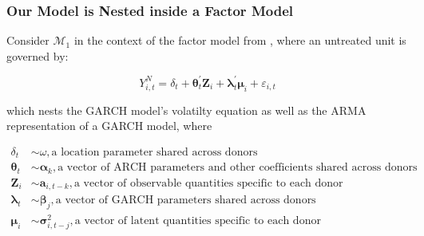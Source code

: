 \documentclass[9pt]{beamer}
\def\mc#1{\mathcal{#1}} %
\def\E{\mathbb{E}} %
\def\mc#1{\mathcal{#1}}
\theoremstyle{definition}
\begin{document}

\begin{frame}
\frametitle{Our Model is Nested inside a Factor Model}

\fontsize{6}{7.2}

Consider $\mc{M}_{1}$ in the context of the factor model from \cite[][]{abadie2010synthetic}, where an untreated unit is governed by:

$$Y^{N}_{i,t} = \delta_{t} + \boldsymbol\theta_{t}^{'}\textbf{Z}_{i}+\boldsymbol\lambda_{t}^{'}\boldsymbol\mu_{i}+\varepsilon_{i,t}$$

which nests the GARCH model's volatilty equation as well as the ARMA representation of a GARCH model, where

\begin{align*}
\delta_{t} & \sim \omega, \text{a location parameter shared across donors}\\
\boldsymbol\theta_{t} & \sim \boldsymbol\alpha_{k}, \text{a vector of ARCH parameters and other coefficients shared across donors} \\
\textbf{Z}_{i} & \sim \boldsymbol a_{i,t-k}, \text{a vector of observable quantities specific to each donor} \\
\boldsymbol \lambda_{t} & \sim \boldsymbol\beta_{j}, \text{a vector of GARCH parameters shared across donors} \\
\boldsymbol \mu_{i} & \sim \boldsymbol \sigma_{i,t-j}^{2}, \text{a vector of latent quantities specific to each donor}   \\
\end{align*}

\end{frame}
\end{document}
